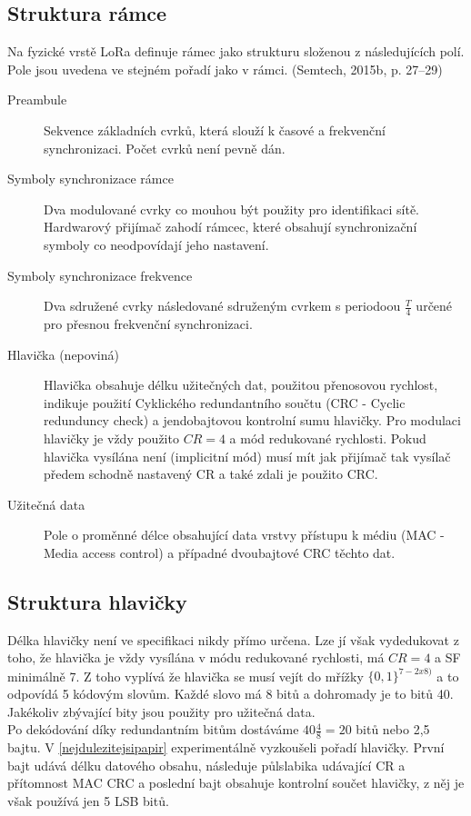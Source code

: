 \documentclass{ctuthesis}
\begin{document}
\subsection{Struktura rámce}
Na fyzické vrstě LoRa definuje rámec jako strukturu složenou z následujících polí. Pole jsou uvedena ve stejném pořadí jako v rámci.  (Semtech, 2015b, p. 27–29)
\begin{description}
\item[Preambule]
Sekvence základních cvrků, která slouží k časové a frekvenční synchronizaci. Počet cvrků není pevně dán.
\item[Symboly synchronizace rámce]
Dva modulované cvrky co mouhou být použity pro identifikaci sítě. Hardwarový přijímač zahodí rámcec, které obsahují synchronizační symboly co neodpovídají jeho nastavení.
\item[Symboly synchronizace frekvence]
Dva sdružené cvrky následované sdruženým cvrkem s periodoou $\frac{T}{4}$ určené pro přesnou frekvenční synchronizaci.
\item[Hlavička (nepoviná)]
Hlavička obsahuje délku užitečných dat, použitou přenosovou rychlost, indikuje použití Cyklického redundantního součtu (CRC - Cyclic redunduncy check) a jendobajtovou kontrolní sumu hlavičky. Pro modulaci hlavičky je vždy použito $CR =4$ a mód redukované rychlosti. Pokud hlavička vysílána není (implicitní mód) musí mít jak přijímač tak vysílač předem schodně nastavený CR a také zdali je použito CRC.
\item[Užitečná data]
Pole o proměnné délce obsahující data vrstvy přístupu k médiu (MAC - Media access control) a případné dvoubajtové CRC těchto dat.
\end{description}
\subsection{Struktura hlavičky}
Délka hlavičky není ve specifikaci nikdy přímo určena. Lze jí však vydedukovat z toho, že hlavička je vždy vysílána v módu redukované rychlosti, má $CR =4$ a SF minimálně 7. Z toho vyplívá že hlavička se musí vejít do mřížky $\{0,1\}^{7-2 x 8)}$ a to odpovídá 5 kódovým slovům. Každé slovo má 8 bitů a dohromady je to bitů 40. Jakékoliv zbývající bity jsou použity pro užitečná data. \\
Po dekódování díky redundantním bitům dostáváme $40\frac{4}{8} = 20$ bitů nebo 2,5 bajtu. V \ref{nejdulezitejsipapir} experimentálně vyzkoušeli pořadí hlavičky. První bajt udává délku datového obsahu, následuje půlslabika  udávající CR a přítomnost MAC CRC a poslední bajt obsahuje kontrolní součet hlavičky, z něj je však používá jen 5 LSB bitů.
\end{document}
